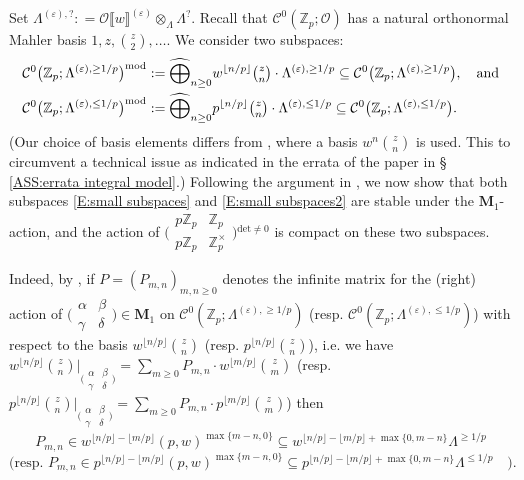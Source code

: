 \documentclass[12pt]{amsart}
\theoremstyle{definition}
\numberwithin{equation}{subsection}
\def\calC{\mathcal{C}}
\def\calO{\mathcal{O}}
\def\ZZ{\mathbb{Z}}
\def\bfM{\mathbf{M}}
\renewcommand{\det}{\mathrm{det}}
\newcommand{\Matrix}[4]{{\big(\begin{smallmatrix}#1&#2\\#3& #4\end{smallmatrix} \big)}}
\begin{document}
Set $ \Lambda^{(\varepsilon),?}: = \calO\llbracket w\rrbracket^{(\varepsilon)}\otimes_{\Lambda}\Lambda^?$.
Recall that $\calC^0(\ZZ_p; \calO)$ has a natural orthonormal Mahler basis $1, z, \binom z2, \dots$.
We consider two subspaces:
\begin{align}
\label{E:small subspaces}
\calC^0 \big(\ZZ_p;  \Lambda^{(\varepsilon),\geq 1/p}\big)^\mathrm{mod}& := \widehat \bigoplus_{n \geq 0} w^{\lfloor n/p\rfloor} \tbinom zn \cdot \Lambda^{(\varepsilon),\geq 1/p} \subseteq \calC^0\big(\ZZ_p; \Lambda^{(\varepsilon),\geq 1/p}\big), \quad \textrm{and}
\\
\label{E:small subspaces2}
\calC^0\big(\ZZ_p; \Lambda^{(\varepsilon),\leq 1/p}\big)^\mathrm{mod} &:= \widehat \bigoplus_{n \geq 0} p^{\lfloor n/p\rfloor} \tbinom zn\cdot \Lambda^{(\varepsilon),\leq 1/p} \subseteq \calC^0\big(\ZZ_p; \Lambda^{(\varepsilon),\leq 1/p}\big).
\end{align}
(Our choice of basis elements differs from \cite[\S\,5.4]{liu-wan-xiao}, where a basis $w^n\binom zn$ is used. This to circumvent a technical issue as indicated in the errata of the paper in \S\,\ref{ASS:errata integral model}.)
Following the argument in \cite[\S\,5.4]{liu-wan-xiao}, we now show that both subspaces \eqref{E:small subspaces} and \eqref{E:small subspaces2} are stable under the $\bfM_1$-action, and the action of $\Matrix{p\ZZ_p}{\ZZ_p}{p\ZZ_p}{\ZZ_p^\times}{}^{\det \neq 0}$ is compact on these two subspaces. %

Indeed, by \cite[Proposition~3.14\,(2)]{liu-wan-xiao}, if $P = (P_{m,n})_{m,n \geq 0}$ denotes the infinite matrix for the (right) action of $\Matrix \alpha\beta\gamma\delta \in \bfM_1$ on $\calC^0(\ZZ_p;\Lambda^{(\varepsilon),\geq 1/p})$ (resp. $\calC^0(\ZZ_p;\Lambda^{(\varepsilon),\leq 1/p})$)  with respect to the basis $w^{\lfloor n/p\rfloor}\binom zn$ (resp. $p^{\lfloor n/p \rfloor} \binom zn$), i.e. we have $w^{\lfloor n/p \rfloor}\binom zn |_{\Matrix \alpha\beta\gamma\delta}=\sum\limits_{m\geq 0} P_{m,n}\cdot w^{\lfloor m/p \rfloor}\binom zm$ (resp. $p^{\lfloor n/p \rfloor}\binom zn |_{\Matrix \alpha\beta\gamma\delta}=\sum\limits_{m\geq 0} P_{m,n}\cdot p^{\lfloor m/p \rfloor}\binom zm$)
 then
\[
P_{m,n} \in w^{\lfloor n/p\rfloor-\lfloor m/p\rfloor} (p, w)^{\max\{m-n,0\}} \subseteq w^{\lfloor n/p\rfloor-\lfloor m/p\rfloor+ \max\{0,m-n\}} \Lambda^{\geq 1/p}
\]
\[
\textrm{(resp. }P_{m,n} \in p^{\lfloor n/p\rfloor-\lfloor m/p\rfloor} (p, w)^{\max\{m-n,0\}} \subseteq p^{\lfloor n/p\rfloor-\lfloor m/p\rfloor+ \max\{0,m-n\}} \Lambda^{\leq 1/p}\quad ).
\]
\end{document}
